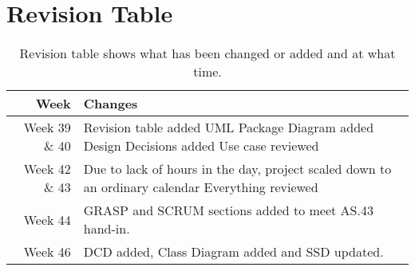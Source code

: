 \section{Revision Table}
\begin{table*}[ht]\centering
  \begin{tabularx}{\textwidth}{@{}rX@{}}
    \toprule
    \textbf{Week} & \textbf{Changes} \\\hline
    Week 39 \& 40 & Revision table added\newline  
		    		UML Package Diagram added\newline
		    		Design Decisions added\newline
		    		Use case reviewed\\\hline
	Week 42 \& 43 & Due to lack of hours in the day, project scaled down to an ordinary calendar \newline
					Everything reviewed\\\hline
	Week 44		  & GRASP and SCRUM sections added to meet AS.43 hand-in.\\\hline
	Week 46		  & DCD added, Class Diagram added and SSD updated.\\
    \bottomrule
  \end{tabularx}
  \caption{Revision table shows what has been changed or added and at what time.}
\end{table*}
\newpage